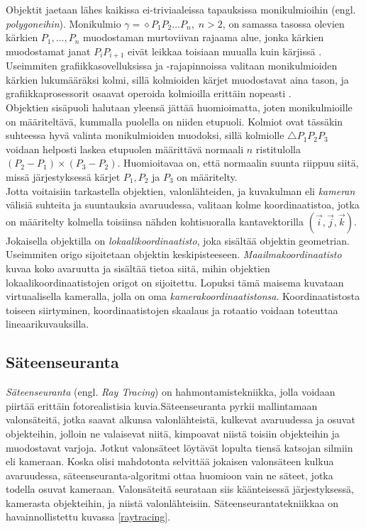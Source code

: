 \documentclass[a4paper, 12pt, titlepage]{article}
\begin{document}
Objektit jaetaan lähes kaikissa ei-triviaaleissa tapauksissa monikulmioihin (engl. \emph{polygoneihin}). Monikulmio $\gamma = \diamond P_1P_2...P_n, \; n > 2$, on samassa tasossa olevien kärkien $P_1,...,P_n$ muodostaman murtoviivan rajaama alue, jonka kärkien muodostamat janat $P_i P_{i+1}$ eivät leikkaa toisiaan muualla kuin kärjissä \citep{harju}. Useimmiten grafiikkasovelluksissa ja -rajapinnoissa valitaan monikulmioiden kärkien lukumääräksi kolmi, sillä kolmioiden kärjet muodostavat aina tason, ja grafiikkaprosessorit osaavat operoida kolmioilla erittäin nopeasti \citep{angel}.\\

Objektien sisäpuoli halutaan yleensä jättää huomioimatta, joten monikulmioille on määriteltävä, kummalla puolella on niiden etupuoli. Kolmiot ovat tässäkin suhteessa hyvä valinta monikulmioiden muodoksi, sillä kolmiolle $\triangle P_1P_2P_3$ voidaan helposti laskea etupuolen määrittävä normaali $n$ ristitulolla $(P_2-P_1) \times (P_3-P_2)$. Huomioitavaa on, että normaalin suunta riippuu siitä, missä järjestyksessä kärjet $P_1, P_2$ ja $P_3$ on määritelty. \citep[.]{hughes}\\

Jotta voitaisiin tarkastella objektien, valonlähteiden, ja kuvakulman eli \emph{kameran} välisiä suhteita ja suuntauksia avaruudessa, valitaan kolme koordinaatistoa, jotka on määritelty kolmella toisiinsa nähden kohtisuoralla kantavektorilla $(\vec{i},\vec{j},\vec{k})$. Jokaisella objektilla on \emph{lokaalikoordinaatisto}, joka sisältää objektin geometrian. Useimmiten origo sijoitetaan objektin keskipisteeseen. \emph{Maailmakoordinaatisto} kuvaa koko avaruutta ja sisältää tietoa siitä, mihin objektien lokaalikoordinaatistojen origot on sijoitettu. Lopuksi tämä maisema kuvataan virtuaalisella kameralla, jolla on oma \emph{kamerakoordinaatistonsa}. Koordinaatistosta toiseen siirtyminen, koordinaatistojen skaalaus ja rotaatio voidaan toteuttaa lineaarikuvauksilla. \citep[.]{janke}

\subsection{Säteenseuranta}

\emph{Säteenseuranta} (engl. \emph{Ray Tracing}) on hahmontamistekniikka, jolla voidaan piirtää erittäin fotorealistisia kuvia.Säteenseuranta pyrkii mallintamaan valonsäteitä, jotka saavat alkunsa valonlähteistä, kulkevat avaruudessa ja osuvat objekteihin, jolloin ne valaisevat niitä, kimpoavat niistä toisiin objekteihin ja muodostavat varjoja. Jotkut valonsäteet löytävät lopulta tiensä katsojan silmiin eli kameraan. Koska olisi mahdotonta selvittää jokaisen valonsäteen kulkua avaruudessa, säteenseuranta-algoritmi ottaa huomioon vain ne säteet, jotka todella osuvat kameraan. Valonsäteitä seurataan siis käänteisessä järjestyksessä, kamerasta objekteihin, ja niistä valonlähteisiin. Säteenseurantatekniikkaa on havainnollistettu kuvassa \ref{raytracing}. \citep[.]{janke}\\
\end{document}
